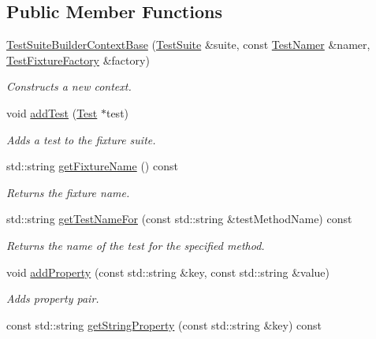 \subsection*{Public Member Functions}
\begin{DoxyCompactItemize}
\item 
\hyperlink{class_test_suite_builder_context_base_a66daacaa6bb5ea4fe95dfff0171b4ce7}{Test\+Suite\+Builder\+Context\+Base} (\hyperlink{class_test_suite}{Test\+Suite} \&suite, const \hyperlink{class_test_namer}{Test\+Namer} \&namer, \hyperlink{class_test_fixture_factory}{Test\+Fixture\+Factory} \&factory)
\begin{DoxyCompactList}\small\item\em Constructs a new context. \end{DoxyCompactList}\item 
void \hyperlink{class_test_suite_builder_context_base_a8b42185139e3efe07a0fe69b9549e928}{add\+Test} (\hyperlink{class_test}{Test} $\ast$test)
\begin{DoxyCompactList}\small\item\em Adds a test to the fixture suite. \end{DoxyCompactList}\item 
std\+::string \hyperlink{class_test_suite_builder_context_base_abba530361ccd63ddf23fcbdc4f33727f}{get\+Fixture\+Name} () const 
\begin{DoxyCompactList}\small\item\em Returns the fixture name. \end{DoxyCompactList}\item 
std\+::string \hyperlink{class_test_suite_builder_context_base_a137a255602edbdc2e1dc575fb53fee9e}{get\+Test\+Name\+For} (const std\+::string \&test\+Method\+Name) const 
\begin{DoxyCompactList}\small\item\em Returns the name of the test for the specified method. \end{DoxyCompactList}\item 
void \hyperlink{class_test_suite_builder_context_base_a358c75376f4d3df2ef570003cbe2e06a}{add\+Property} (const std\+::string \&key, const std\+::string \&value)
\begin{DoxyCompactList}\small\item\em Adds property pair. \end{DoxyCompactList}\item 
const std\+::string \hyperlink{class_test_suite_builder_context_base_a9955d3fda5115963ee0310d09a3b15d9}{get\+String\+Property} (const std\+::string \&key) const 

\end{DoxyCompactItemize}
